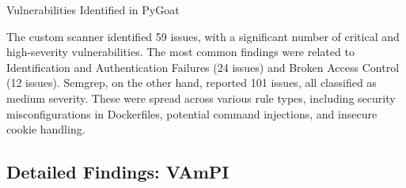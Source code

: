 \begin{table}[h!]
\centering
\caption{Vulnerabilities Identified in PyGoat}
\label{tab:pygoat_vulns}
\caption*{
\footnotesize *The custom scanner encountered a parsing error when analyzing PyGoat's dependencies, resulting in an incomplete component scan.
}
\end{table}

The custom scanner identified 59 issues, with a significant number of critical and high-severity vulnerabilities. The most common findings were related to Identification and Authentication Failures (24 issues) and Broken Access Control (12 issues). Semgrep, on the other hand, reported 101 issues, all classified as medium severity. These were spread across various rule types, including security misconfigurations in Dockerfiles, potential command injections, and insecure cookie handling.

\subsection{Detailed Findings: VAmPI}

